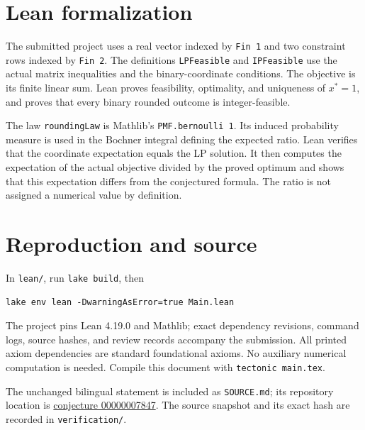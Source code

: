 \documentclass[11pt]{article}
\begin{document}
\section*{Lean formalization}
The submitted project uses a real vector indexed by \texttt{Fin 1} and two constraint rows indexed by \texttt{Fin 2}. The definitions \texttt{LPFeasible} and \texttt{IPFeasible} use the actual matrix inequalities and the binary-coordinate conditions. The objective is its finite linear sum. Lean proves feasibility, optimality, and uniqueness of $x^*=1$, and proves that every binary rounded outcome is integer-feasible.

The law \texttt{roundingLaw} is Mathlib's \texttt{PMF.bernoulli 1}. Its induced probability measure is used in the Bochner integral defining the expected ratio. Lean verifies that the coordinate expectation equals the LP solution. It then computes the expectation of the actual objective divided by the proved optimum and shows that this expectation differs from the conjectured formula. The ratio is not assigned a numerical value by definition.

\section*{Reproduction and source}
In \texttt{lean/}, run \texttt{lake build}, then
\begin{verbatim}
lake env lean -DwarningAsError=true Main.lean
\end{verbatim}
The project pins Lean 4.19.0 and Mathlib; exact dependency revisions, command logs, source hashes, and review records accompany the submission. All printed axiom dependencies are standard foundational axioms. No auxiliary numerical computation is needed. Compile this document with \texttt{tectonic main.tex}.

The unchanged bilingual statement is included as \texttt{SOURCE.md}; its repository location is \href{https://github.com/The-Last-Math-Competition/The-Last-Math-Competition/blob/main/conjectures/00000007847.md}{conjecture 00000007847}. The source snapshot and its exact hash are recorded in \texttt{verification/}.
\end{document}
